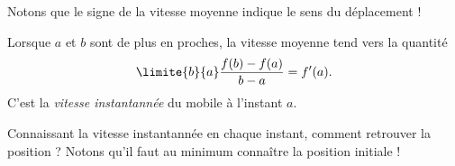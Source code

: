 \begin{frame}%
  \begin{remark}
    Notons que le signe de la vitesse moyenne indique le sens du déplacement !
  \end{remark}\pause{}

  Lorsque \(a\) et \(b\) sont de plus en proches, la vitesse moyenne tend vers la quantité
  \begin{equation*}
    \limite{b}{a}  \frac{f(b)-f(a)}{b-a} = f'(a).
  \end{equation*}\pause{}
  C'est la \emph{vitesse instantannée} du mobile à l'instant \(a\).\pause{}

  \begin{center}
  \end{center}\pause

  \begin{remark*}
    Connaissant la vitesse instantannée en chaque instant, comment retrouver la position ?\pause{} Notons qu'il faut au minimum connaître la position initiale !
  \end{remark*}
\end{frame}

